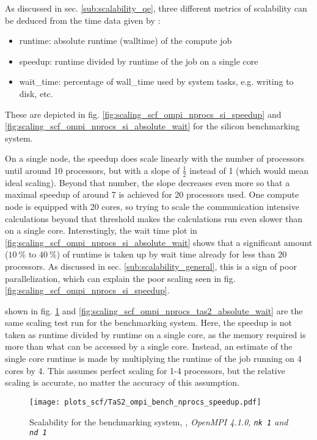 \documentclass[main.tex]{subfiles}
\begin{document}
As discussed in sec. \ref{sub:scalability_qe}, three different metrics of scalability can be deduced from the time data given by \QE:
\begin{itemize}
    \item runtime: absolute runtime (walltime) of the compute job
    \item speedup: runtime divided by runtime of the job on a single core
    \item \gls{wait_time}: percentage of \gls{wall_time} used by system tasks, e.g. writing to disk, etc.
\end{itemize}
These are depicted in fig. \ref{fig:scaling_scf_ompi_nprocs_si_speedup} and \ref{fig:scaling_scf_ompi_nprocs_si_absolute_wait} for the silicon benchmarking system.

On a single node, the speedup does scale linearly with the number of processors until around 10 processors, but with a slope of \(\frac{1}{2}\) instead of 1 (which would mean ideal scaling).
Beyond that number, the slope decreases even more so that a maximal speedup of around 7 is achieved for 20 processors used.
One compute node is equipped with 20 cores, so trying to scale the communication intensive calculations beyond that threshold makes the calculations run even slower than on a single core.
Interestingly, the wait time plot in \ref{fig:scaling_scf_ompi_nprocs_si_absolute_wait} shows that a significant amount (\(\SI{10}{\percent}\) to \(\SI{40}{\percent}\)) of runtime is taken up by wait time already for less than 20 processors.
As discussed in sec. \ref{sub:scalability_general}, this is a sign of poor parallelization, which can explain the poor scaling seen in fig. \ref{fig:scaling_scf_ompi_nprocs_si_speedup}.

shown in fig. \ref{fig:scaling_scf_ompi_nprocs_tas2_speedup} and \ref{fig:scaling_scf_ompi_nprocs_tas2_absolute_wait} are the same scaling test run for the \TaS benchmarking system.
Here, the speedup is not taken as runtime divided by runtime on a single core, as the memory required is more than what can be accessed by a single core.
Instead, an estimate of the single core runtime is made by multiplying the runtime of the job running on 4 cores by 4.
This assumes perfect scaling for 1-4 processors, but the relative scaling is accurate, no matter the accuracy of this assumption.

\begin{figure}[ht!]
\centering
\texttt{[image: plots\_scf/TaS2\_ompi\_bench\_nprocs\_speedup.pdf]}
\caption{Scalability for the \TaS benchmarking system, \emph{, OpenMPI 4.1.0, \texttt{nk 1} and \texttt{nd 1}}}
\label{fig:scaling_scf_ompi_nprocs_tas2_speedup}
\end{figure}
\end{document}
